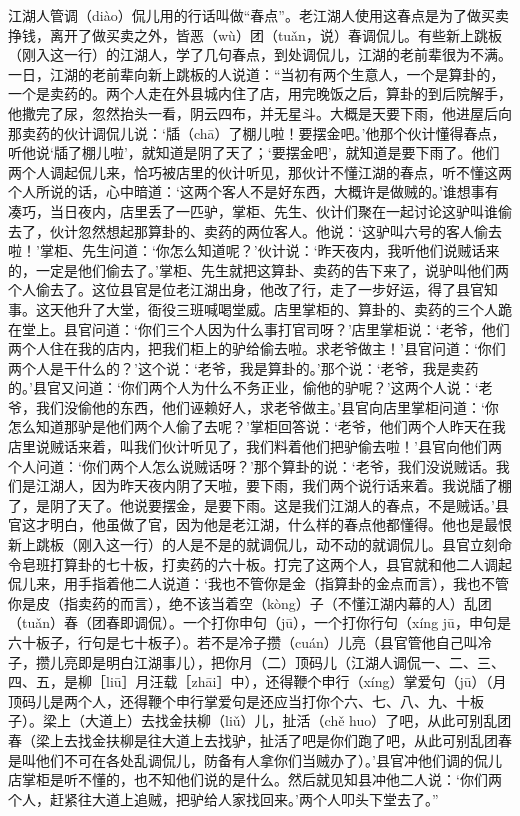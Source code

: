 \documentclass[12pt,UTF8]{ctexbook}
\begin{document}
江湖人管调（diào）侃儿用的行话叫做“春点”。老江湖人使用这春点是为了做买卖挣钱，离开了做买卖之外，皆恶（wù）团（tuǎn，说）春调侃儿。有些新上跳板（刚入这一行）的江湖人，学了几句春点，到处调侃儿，江湖的老前辈很为不满。一日，江湖的老前辈向新上跳板的人说道：“当初有两个生意人，一个是算卦的，一个是卖药的。两个人走在外县城内住了店，用完晚饭之后，算卦的到后院解手，他撒完了尿，忽然抬头一看，阴云四布，并无星斗。大概是天要下雨，他进屋后向那卖药的伙计调侃儿说：‘牐（chā）了棚儿啦！要摆金吧。’他那个伙计懂得春点，听他说‘牐了棚儿啦’，就知道是阴了天了；‘要摆金吧’，就知道是要下雨了。他们两个人调起侃儿来，恰巧被店里的伙计听见，那伙计不懂江湖的春点，听不懂这两个人所说的话，心中暗道：‘这两个客人不是好东西，大概许是做贼的。’谁想事有凑巧，当日夜内，店里丢了一匹驴，掌柜、先生、伙计们聚在一起讨论这驴叫谁偷去了，伙计忽然想起那算卦的、卖药的两位客人。他说：‘这驴叫六号的客人偷去啦！’掌柜、先生问道：‘你怎么知道呢？’伙计说：‘昨天夜内，我听他们说贼话来的，一定是他们偷去了。’掌柜、先生就把这算卦、卖药的告下来了，说驴叫他们两个人偷去了。这位县官是位老江湖出身，他改了行，走了一步好运，得了县官知事。这天他升了大堂，衙役三班喊喝堂威。店里掌柜的、算卦的、卖药的三个人跪在堂上。县官问道：‘你们三个人因为什么事打官司呀？’店里掌柜说：‘老爷，他们两个人住在我的店内，把我们柜上的驴给偷去啦。求老爷做主！’县官问道：‘你们两个人是干什么的？’这个说：‘老爷，我是算卦的。’那个说：‘老爷，我是卖药的。’县官又问道：‘你们两个人为什么不务正业，偷他的驴呢？’这两个人说：‘老爷，我们没偷他的东西，他们诬赖好人，求老爷做主。’县官向店里掌柜问道：‘你怎么知道那驴是他们两个人偷了去呢？’掌柜回答说：‘老爷，他们两个人昨天在我店里说贼话来着，叫我们伙计听见了，我们料着他们把驴偷去啦！’县官向他们两个人问道：‘你们两个人怎么说贼话呀？’那个算卦的说：‘老爷，我们没说贼话。我们是江湖人，因为昨天夜内阴了天啦，要下雨，我们两个说行话来着。我说牐了棚了，是阴了天了。他说要摆金，是要下雨。这是我们江湖人的春点，不是贼话。’县官这才明白，他虽做了官，因为他是老江湖，什么样的春点他都懂得。他也是最恨新上跳板（刚入这一行）的人是不是的就调侃儿，动不动的就调侃儿。县官立刻命令皂班打算卦的七十板，打卖药的六十板。打完了这两个人，县官就和他二人调起侃儿来，用手指着他二人说道：‘我也不管你是金（指算卦的金点而言），我也不管你是皮（指卖药的而言），绝不该当着空（kòng）子（不懂江湖内幕的人）乱团（tuǎn）春（团春即调侃）。一个打你申句（jū），一个打你行句（xíng jū，申句是六十板子，行句是七十板子）。若不是冷子攒（cuán）儿亮（县官管他自己叫冷子，攒儿亮即是明白江湖事儿），把你月（二）顶码儿（江湖人调侃一、二、三、四、五，是柳［liū］月汪载［zhāi］中），还得鞭个申行（xíng）掌爱句（jū）（月顶码儿是两个人，还得鞭个申行掌爱句是还应当打你个六、七、八、九、十板子）。梁上（大道上）去找金扶柳（liǔ）儿，扯活（chě huo）了吧，从此可别乱团春（梁上去找金扶柳是往大道上去找驴，扯活了吧是你们跑了吧，从此可别乱团春是叫他们不可在各处乱调侃儿，防备有人拿你们当贼办了）。’县官冲他们调的侃儿店掌柜是听不懂的，也不知他们说的是什么。然后就见知县冲他二人说：‘你们两个人，赶紧往大道上追贼，把驴给人家找回来。’两个人叩头下堂去了。”
\end{document}
